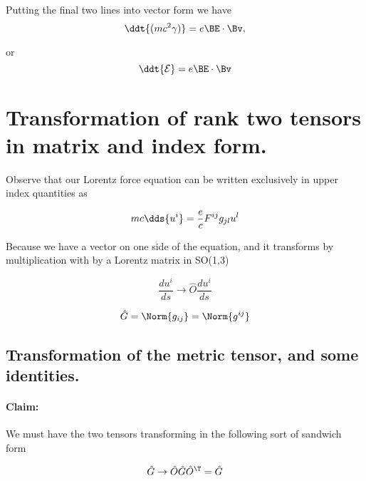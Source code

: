Putting the final two lines into vector form we have
\begin{equation}\label{eqn:relativisticElectrodynamicsL11:330}
\ddt{ (m c^2 \gamma)} = e \BE \cdot \Bv,
\end{equation}

or
\begin{equation}\label{eqn:relativisticElectrodynamicsL11:350}
\ddt{ \mathcal{E} } = e \BE \cdot \Bv
\end{equation}

\section{Transformation of rank two tensors in matrix and index form.}

Observe that our Lorentz force equation can be written exclusively in upper index quantities as

\begin{equation}\label{eqn:relativisticElectrodynamicsL11:370}
m c \dds{u^i} = \frac{e}{c} F^{ij} g_{jl} u^l
\end{equation}

Because we have a vector on one side of the equation, and it transforms by multiplication with by a Lorentz matrix in SO(1,3)

\begin{equation}\label{eqn:relativisticElectrodynamicsL11:390}
\frac{du^i}{ds} \rightarrow \hat{O} \frac{du^i}{ds} 
\end{equation}

\begin{equation}\label{eqn:relativisticElectrodynamicsL11:410}
\hat{G} = \Norm{ g_{ij} } = \Norm{ g^{ij} }
\end{equation}

\subsection{Transformation of the metric tensor, and some identities.}

\paragraph{Claim:}
We must have the two tensors transforming in the following sort of sandwich form

\begin{equation}\label{eqn:relativisticElectrodynamicsL11:430}
\hat{G} \rightarrow \hat{O} \hat{G} \hat{O}^\T = \hat{G}
\end{equation}

